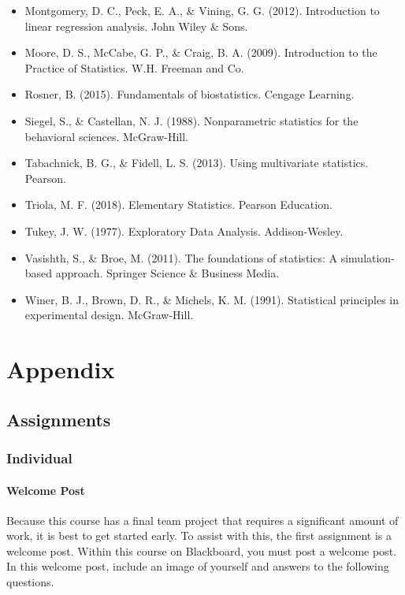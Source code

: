 \documentclass[
  b5paper]{book}
\begin{document}
\begin{itemize}
\item
  Montgomery, D. C., Peck, E. A., \& Vining, G. G. (2012). Introduction to linear regression analysis. John Wiley \& Sons.
\item
  Moore, D. S., McCabe, G. P., \& Craig, B. A. (2009). Introduction to the Practice of Statistics. W.H. Freeman and Co.
\item
  Rosner, B. (2015). Fundamentals of biostatistics. Cengage Learning.
\item
  Siegel, S., \& Castellan, N. J. (1988). Nonparametric statistics for the behavioral sciences. McGraw-Hill.
\item
  Tabachnick, B. G., \& Fidell, L. S. (2013). Using multivariate statistics. Pearson.
\item
  Triola, M. F. (2018). Elementary Statistics. Pearson Education.
\item
  Tukey, J. W. (1977). Exploratory Data Analysis. Addison-Wesley.
\item
  Vasishth, S., \& Broe, M. (2011). The foundations of statistics: A simulation-based approach. Springer Science \& Business Media.
\item
  Winer, B. J., Brown, D. R., \& Michels, K. M. (1991). Statistical principles in experimental design. McGraw-Hill.
\end{itemize}

\hypertarget{appendix}{%
\chapter{Appendix}\label{appendix}}

\hypertarget{assignments}{%
\section{Assignments}\label{assignments}}

\hypertarget{individual}{%
\subsection*{Individual}\label{individual}}

\hypertarget{welcome-post}{%
\subsubsection*{Welcome Post}\label{welcome-post}}

Because this course has a final team project that requires a significant amount of work, it is best to get started early. To assist with this, the first assignment is a welcome post. Within this course on Blackboard, you must post a welcome post. In this welcome post, include an image of yourself and answers to the following questions.
\end{document}
